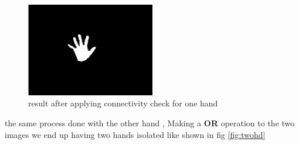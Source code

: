  \begin{figure}[H]
\centering
\includegraphics[width=0.5\textwidth]{img/finalresult.png}
\caption{result after applying connectivity check for one hand  }
\label{fig:cam11}
\end{figure}

the same process done with the other hand , Making a \textbf{OR } operation to the two images we end up having two hands isolated like shown in fig \ref{fig:twohd}

